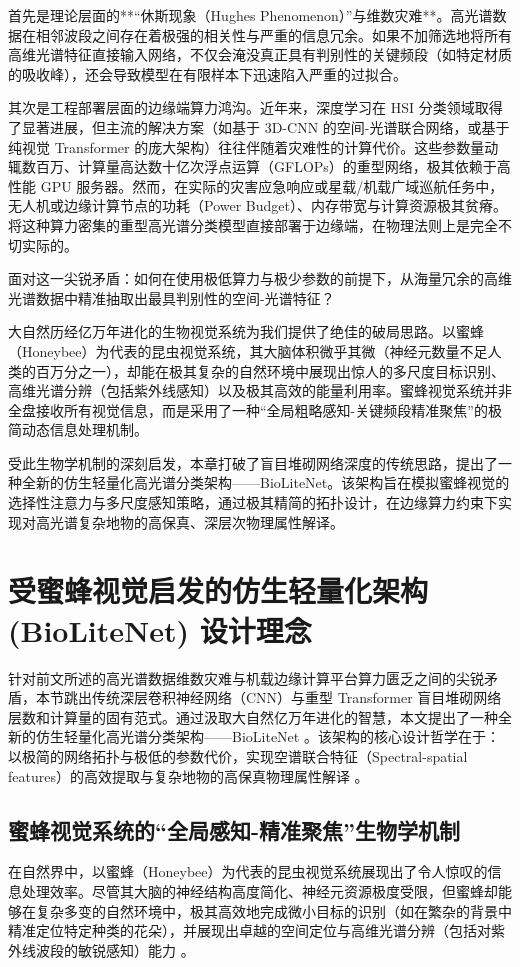 首先是理论层面的**“休斯现象（Hughes Phenomenon）”与维数灾难**。高光谱数据在相邻波段之间存在着极强的相关性与严重的信息冗余。如果不加筛选地将所有高维光谱特征直接输入网络，不仅会淹没真正具有判别性的关键频段（如特定材质的吸收峰），还会导致模型在有限样本下迅速陷入严重的过拟合。

其次是工程部署层面的边缘端算力鸿沟。近年来，深度学习在 HSI 分类领域取得了显著进展，但主流的解决方案（如基于 3D-CNN 的空间-光谱联合网络，或基于纯视觉 Transformer 的庞大架构）往往伴随着灾难性的计算代价。这些参数量动辄数百万、计算量高达数十亿次浮点运算（GFLOPs）的重型网络，极其依赖于高性能 GPU 服务器。然而，在实际的灾害应急响应或星载/机载广域巡航任务中，无人机或边缘计算节点的功耗（Power Budget）、内存带宽与计算资源极其贫瘠。将这种算力密集的重型高光谱分类模型直接部署于边缘端，在物理法则上是完全不切实际的。

面对这一尖锐矛盾：如何在使用极低算力与极少参数的前提下，从海量冗余的高维光谱数据中精准抽取出最具判别性的空间-光谱特征？

大自然历经亿万年进化的生物视觉系统为我们提供了绝佳的破局思路。以蜜蜂（Honeybee）为代表的昆虫视觉系统，其大脑体积微乎其微（神经元数量不足人类的百万分之一），却能在极其复杂的自然环境中展现出惊人的多尺度目标识别、高维光谱分辨（包括紫外线感知）以及极其高效的能量利用率。蜜蜂视觉系统并非全盘接收所有视觉信息，而是采用了一种“全局粗略感知-关键频段精准聚焦”的极简动态信息处理机制。

受此生物学机制的深刻启发，本章打破了盲目堆砌网络深度的传统思路，提出了一种全新的仿生轻量化高光谱分类架构——BioLiteNet。该架构旨在模拟蜜蜂视觉的选择性注意力与多尺度感知策略，通过极其精简的拓扑设计，在边缘算力约束下实现对高光谱复杂地物的高保真、深层次物理属性解译。

\section{受蜜蜂视觉启发的仿生轻量化架构 (BioLiteNet) 设计理念}
针对前文所述的高光谱数据维数灾难与机载边缘计算平台算力匮乏之间的尖锐矛盾，本节跳出传统深层卷积神经网络（CNN）与重型 Transformer 盲目堆砌网络层数和计算量的固有范式。通过汲取大自然亿万年进化的智慧，本文提出了一种全新的仿生轻量化高光谱分类架构——BioLiteNet 。该架构的核心设计哲学在于：以极简的网络拓扑与极低的参数代价，实现空谱联合特征（Spectral-spatial features）的高效提取与复杂地物的高保真物理属性解译 。

\subsection{蜜蜂视觉系统的“全局感知-精准聚焦”生物学机制}
在自然界中，以蜜蜂（Honeybee）为代表的昆虫视觉系统展现出了令人惊叹的信息处理效率。尽管其大脑的神经结构高度简化、神经元资源极度受限，但蜜蜂却能够在复杂多变的自然环境中，极其高效地完成微小目标的识别（如在繁杂的背景中精准定位特定种类的花朵），并展现出卓越的空间定位与高维光谱分辨（包括对紫外线波段的敏锐感知）能力 。

